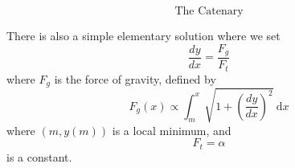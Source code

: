 \documentclass[11pt]{scrartcl}
\begin{document}
\begin{center}
\end{center}

\[\text{The Catenary}\]

\begin{remark*}
    There is also a simple elementary solution where we set \[\frac{dy}{dx} = \frac{F_g}{F_t}\] where $F_g$ is the force of gravity, defined by \[F_g(x) \propto \int_m^x \sqrt{1 + \left ( \frac{dy}{dx}\right )^2} \ \mathrm dx\] where $(m, y(m))$ is a local minimum, and \[F_t = \alpha\] is a constant. 
\end{remark*}




\end{document}

